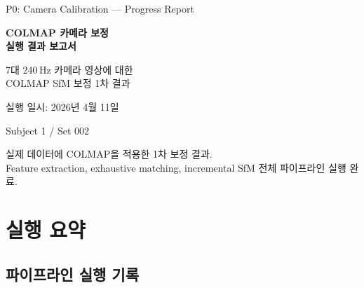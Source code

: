 \documentclass[11pt, a4paper]{report}
\begin{document}
\begin{titlepage}
\centering
\vspace*{2cm}
{\Large\color{gray} P0: Camera Calibration --- Progress Report}
\vspace{0.5cm}

{\Huge\bfseries\color{defblue} COLMAP 카메라 보정\\[0.3cm]
실행 결과 보고서}

\vspace{1cm}

{\LARGE\color{defblue!70!black} 7대 240\,Hz 카메라 영상에 대한\\
COLMAP SfM 보정 1차 결과}

\vspace{2cm}

{\large 실행 일시: 2026년 4월 11일}

\vspace{0.5cm}

{\large Subject 1 / Set 002}

\vspace{\fill}
{\small\color{gray} 실제 데이터에 COLMAP을 적용한 1차 보정 결과.\\
Feature extraction, exhaustive matching, incremental SfM 전체 파이프라인 실행 완료.}
\end{titlepage}

\tableofcontents
\newpage


\chapter{실행 요약}

\section{파이프라인 실행 기록}
\end{document}

